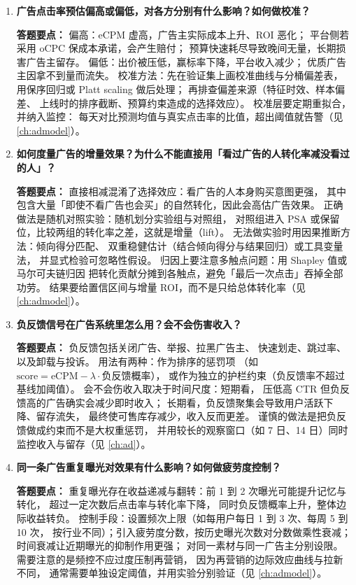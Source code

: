 \begin{interview}[题库与答题要点]
\begin{enumerate}[label=]
  \item[\textcolor{VioletDeep}{\textbf{Q68.}}] \textbf{广告点击率预估偏高或偏低，对各方分别有什么影响？如何做校准？}
\par\smallskip\noindent\textcolor{VioletDeep}{\textbf{答题要点：}}
偏高：eCPM 虚高，广告主实际成本上升、ROI 恶化；
平台侧若采用 oCPC 保成本承诺，会产生赔付；
预算快速耗尽导致晚间无量，长期损害广告主留存。
偏低：出价被压低，赢标率下降，平台收入减少；
优质广告主因拿不到量而流失。
校准方法：先在验证集上画校准曲线与分桶偏差表，
用保序回归或 Platt scaling 做后处理；
再排查偏差来源（特征时效、样本偏差、
上线时的排序截断、预算约束造成的选择效应）。
校准层要定期重拟合，并纳入监控：
每天对比预测均值与真实点击率的比值，超出阈值就告警（见 \cref{ch:admodel}）。

  \item[\textcolor{VioletDeep}{\textbf{Q69.}}] \textbf{如何度量广告的增量效果？为什么不能直接用「看过广告的人转化率减没看过的人」？}
\par\smallskip\noindent\textcolor{VioletDeep}{\textbf{答题要点：}}
直接相减混淆了选择效应：看广告的人本身购买意图更强，
其中包含大量「即使不看广告也会买」的自然转化，因此会高估广告效果。
正确做法是随机对照实验：随机划分实验组与对照组，
对照组进入 PSA 或保留位，比较两组的转化率之差，这就是增量（lift）。
无法做实验时用因果推断方法：倾向得分匹配、
双重稳健估计（结合倾向得分与结果回归）或工具变量法，
并显式检验可忽略性假设。
归因上要注意多触点问题：用 Shapley 值或马尔可夫链归因
把转化贡献分摊到各触点，避免「最后一次点击」吞掉全部功劳。
结果要给置信区间与增量 ROI，而不是只给总体转化率（见 \cref{ch:admodel}）。

  \item[\textcolor{VioletDeep}{\textbf{Q70.}}] \textbf{负反馈信号在广告系统里怎么用？会不会伤害收入？}
\par\smallskip\noindent\textcolor{VioletDeep}{\textbf{答题要点：}}
负反馈包括关闭广告、举报、拉黑广告主、
快速划走、跳过率、以及卸载与投诉。
用法有两种：作为排序的惩罚项
（如 $\text{score} = \text{eCPM} - \lambda\cdot\text{负反馈概率}$），
或作为独立的护栏约束（负反馈率不超过基线加阈值）。
会不会伤收入取决于时间尺度：短期看，
压低高 CTR 但负反馈高的广告确实会减少即时收入；
长期看，负反馈聚集会导致用户活跃下降、留存流失，
最终使可售库存减少，收入反而更差。
谨慎的做法是把负反馈做成约束而不是大权重惩罚，
并用较长的观察窗口（如 7 日、14 日）同时监控收入与留存（见 \cref{ch:ad}）。

  \item[\textcolor{VioletDeep}{\textbf{Q71.}}] \textbf{同一条广告重复曝光对效果有什么影响？如何做疲劳度控制？}
\par\smallskip\noindent\textcolor{VioletDeep}{\textbf{答题要点：}}
重复曝光存在收益递减与翻转：前 1 到 2 次曝光可能提升记忆与转化，
超过一定次数后点击率与转化率下降，
同时负反馈概率上升，整体边际收益转负。
控制手段：设置频次上限（如每用户每日 1 到 3 次、每周 5 到 10 次，
按行业不同）；引入疲劳度分数，按历史曝光次数对分数做乘性衰减；
时间衰减让近期曝光的抑制作用更强；
对同一素材与同一广告主分别设限。
需要注意的是频控不应过度压制再营销，
因为再营销的边际效应曲线与拉新不同，
通常需要单独设定阈值，并用实验分别验证（见 \cref{ch:admodel}）。


\end{enumerate}
\end{interview}
